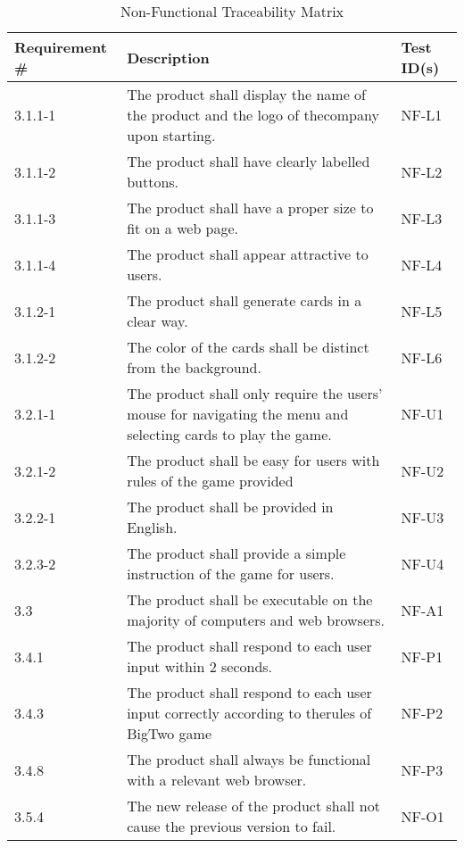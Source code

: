 \documentclass[12pt, titlepage]{article}
\begin{document}
\begin{table}[h!]
\centering
\caption{Non-Functional Traceability Matrix}
\label{table:1}
\begin{tabular}{|p{2.5cm} p{10cm} p{2.5cm}|} 
 \hline
 Requirement \# & Description & Test ID(s) \\ 
 \hline
 3.1.1-1 & The product shall display the name of the product and the logo of thecompany upon starting. & NF-L1 \\ 
 3.1.1-2 & The product shall have clearly labelled buttons. & NF-L2 \\ 
 3.1.1-3 & The product shall have a proper size to fit on a web page. & NF-L3 \\ 
 3.1.1-4 & The product shall appear attractive to users. & NF-L4 \\ 
 3.1.2-1 & The product shall generate cards in a clear way. & NF-L5 \\  
 3.1.2-2 & The color of the cards shall be distinct from the background. & NF-L6 \\
 3.2.1-1 & The product shall only require the users’ mouse for navigating the menu and selecting cards to play the game. & NF-U1 \\
 3.2.1-2 & The product shall be easy for users with rules of the game provided & NF-U2 \\
 3.2.2-1 & The product shall be provided in English. & NF-U3 \\
 3.2.3-2 & The product shall provide a simple instruction of the game for users. & NF-U4 \\
 3.3 & The product shall be executable on the majority of computers and web browsers. & NF-A1 \\
 3.4.1 & The product shall respond to each user input within 2 seconds. & NF-P1 \\
 3.4.3 & The product shall respond to each user input correctly according to therules of BigTwo game & NF-P2 \\
 3.4.8 & The product shall always be functional with a relevant web browser. & NF-P3 \\
 3.5.4 & The new release of the product shall not cause the previous version to fail. & NF-O1 \\
 \hline
\end{tabular}
\end{table}

\newpage
\end{document}
